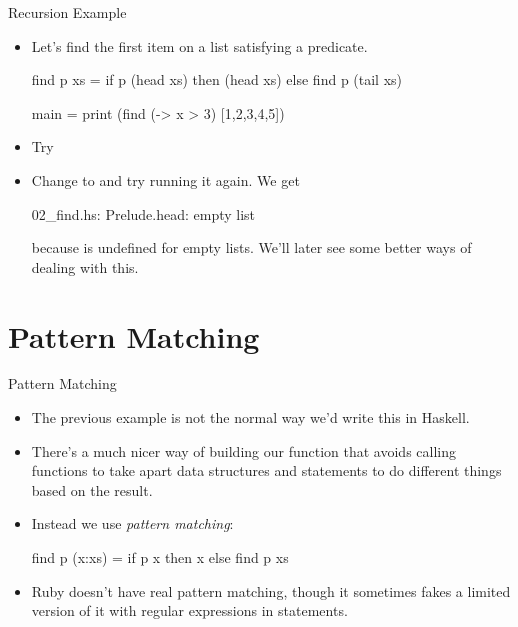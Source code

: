 \documentclass[xcolor=dvipsnames]{beamer}          %
\newcommand{\lH}[1]{\color{MidnightBlue}{#1}}
\newcommand{\lS}[1]{\color{Green}{#1}}
\begin{document}
\begin{frame}[fragile]{Recursion Example}
\begin{itemize}
    \item Let's find the first item on a list satisfying a predicate.
        \begin{hlisting}
            find p xs =
                if p (head xs) then (head xs)
                               else find p (tail xs)

            main = print (find (\x -> x > 3) [1,2,3,4,5])
        \end{hlisting}
    \item Try \T{\lS{runghc ex/02\_find.hs}}
    \item Change \T{\lH{x > 3}} to \T{\lH{x > 7}} and try running it again.
        We get
        \begin{olisting}
            02_find.hs: Prelude.head: empty list
        \end{olisting}
        because  is undefined for empty lists. We'll later see
        some better ways of dealing with this.
\end{itemize}
\end{frame}


\section{Pattern Matching}

\begin{frame}[fragile]{Pattern Matching}
\begin{itemize}
    \item The previous example is not the normal way we'd write this
        in Haskell.
    \item There's a much nicer way of building our  function that
        avoids calling functions to take apart data structures and 
        statements to do different things based on the result.
    \item Instead we use \emph{pattern matching}:
        \begin{hlisting}
            find p (x:xs) =
                if p x then x
                       else find p xs
        \end{hlisting}
    \item Ruby doesn't have real pattern matching, though it sometimes
        fakes a limited version of it with regular expressions in
         statements.
\end{itemize}
\end{frame}
\end{document}
